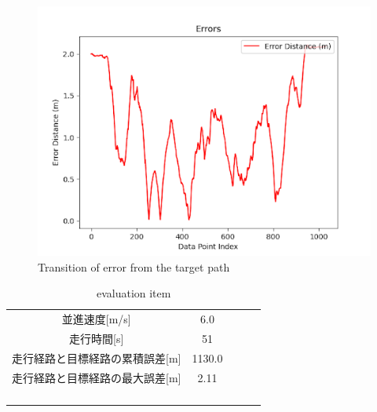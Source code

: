 \begin{figure}[H]
     \centering
    \includegraphics[keepaspectratio, scale=0.7]
         {images/6mserror.png}
    \caption{Transition of error from the target path}
    \label{fig:path}
\end{figure}

\begin{table}[H]
     \centering
     \caption{evaluation item}
     \begin{tabular}{cclll}
     \multicolumn{1}{c|}{並進速度{[}m/s{]}}         & 6.0  &  &  &  \\
     \multicolumn{1}{c|}{走行時間{[}s{]}}           & 51   &  &  &  \\
     \multicolumn{1}{c|}{走行経路と目標経路の累積誤差{[}m{]}} & 1130.0 &  &  &  \\
     \multicolumn{1}{c|}{走行経路と目標経路の最大誤差{[}m{]}} & 2.11 &  &  &  \\
                                                &      &  &  &  \\
                                                &      &  &  &  \\
     \multicolumn{1}{l}{}                       &      &  &  &  \\
     \multicolumn{1}{l}{}                       &      &  &  & 
     \end{tabular}
\end{table}